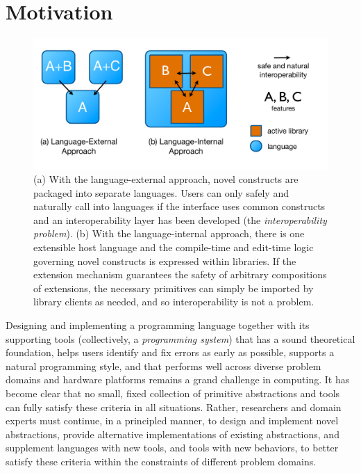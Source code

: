 \section{Motivation}\label{motivation}\begin{figure}
\begin{center}
\includegraphics[scale=0.45]{approaches.pdf}
\end{center}
\vspace{-20px}
\caption{\small (a) With the language-external approach, novel constructs are packaged into separate languages. Users can only safely and naturally call into languages if the interface uses common constructs and an interoperability layer has been developed (the \emph{interoperability problem}). (b) With the language-internal approach, there is one extensible host language and the compile-time and edit-time logic governing novel constructs is expressed within libraries. If the extension mechanism guarantees the safety of arbitrary compositions of extensions, the necessary primitives can simply be imported by library clients as needed, and so interoperability is not a problem.}
\label{approaches}
\end{figure}
Designing and implementing a programming language together with its supporting tools (collectively, a \emph{programming system}) that has a sound theoretical foundation, helps users identify and fix errors as early as possible, supports a natural programming style, and that performs well across diverse problem domains and hardware platforms remains a grand challenge in computing. It has become clear that no small, fixed collection of primitive abstractions and tools can fully satisfy these criteria in all situations. Rather, researchers and domain experts must continue, in a principled manner, to design and implement novel abstractions, provide alternative implementations of existing abstractions, and supplement languages with new tools, and tools with new behaviors, to better satisfy these criteria within the constraints of different problem domains. 

